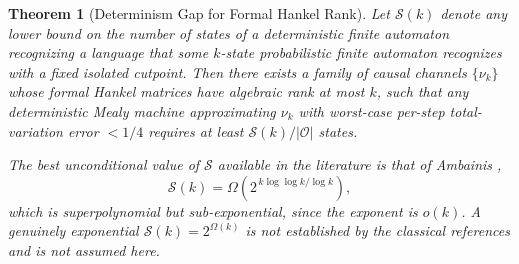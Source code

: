 \documentclass[12pt]{article}
\newtheorem{theorem}{Theorem}[section]
\theoremstyle{definition}
\begin{document}
\begin{theorem}[Determinism Gap for Formal Hankel Rank]
\label{thm:exp-gap}
Let $\mathcal S(k)$ denote any lower bound on the number of states of a
deterministic finite automaton recognizing a language that some $k$-state
probabilistic finite automaton recognizes with a fixed isolated cutpoint.  Then
there exists a family of causal channels $\{\nu_k\}$ whose formal Hankel
matrices have \emph{algebraic} rank at most $k$, such that any deterministic
Mealy machine approximating $\nu_k$ with worst-case per-step total-variation
error $<1/4$ requires at least $\mathcal S(k)/|\mathcal O|$ states.

The best unconditional value of $\mathcal S$ available in the literature is
that of Ambainis \cite{ambainis1996},
\[
\mathcal S(k)
=
\Omega\!\left(2^{\,k\log\log k/\log k}\right),
\]
which is superpolynomial but \emph{sub}-exponential, since the exponent is
$o(k)$.  A genuinely exponential $\mathcal S(k)=2^{\Omega(k)}$ is not
established by the classical references and is not assumed here.
\end{theorem}
\end{document}
